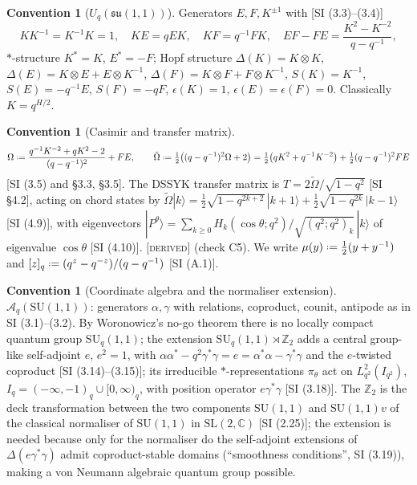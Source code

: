\documentclass[11pt,a4paper]{article}
\providecommand{\coloneqq}{\mathrel{\vcenter{\baselineskip0.5ex \lineskiplimit0pt
      \hbox{\scriptsize.}\hbox{\scriptsize.}}}=}
\newcommand{\DERIVED}{{\color{teal}\textsc{[derived]}}}
\theoremstyle{definition}
\newtheorem{convention}[definition]{Convention}
\theoremstyle{plain}
\newcommand{\Uq}{U_q(\mathfrak{su}(1,1))}
\newcommand{\SUq}{\mathrm{SU}_q(1,1)}
\newcommand{\Cas}{\Omega}                       %
\newcommand{\tCas}{\tilde\Omega}                %
\newcommand{\Z}{\mathbb{Z}}
\newcommand{\C}{\mathbb{C}}
\newcommand{\A}{\mathcal{A}}
\newcommand{\ket}[1]{|#1\rangle}
\renewcommand{\P}{P}                            %
\begin{document}
\begin{convention}[$\Uq$]\label{conv:Uq}
Generators $E,F,K^{\pm1}$ with [SI (3.3)--(3.4)]
\begin{equation}\label{eq:ourUq}
  KK^{-1}=K^{-1}K=1,\quad KE=qEK,\quad KF=q^{-1}FK,\quad
  EF-FE=\frac{K^{2}-K^{-2}}{q-q^{-1}},
\end{equation}
$*$-structure $K^{*}=K$, $E^{*}=-F$; Hopf structure $\Delta(K)=K\otimes K$,
$\Delta(E)=K\otimes E+E\otimes K^{-1}$, $\Delta(F)=K\otimes F+F\otimes K^{-1}$,
$S(K)=K^{-1}$, $S(E)=-q^{-1}E$, $S(F)=-qF$, $\epsilon(K)=1$, $\epsilon(E)=\epsilon(F)=0$.
Classically $K=q^{H/2}$.
\end{convention}

\begin{convention}[Casimir and transfer matrix]\label{conv:casimir}
\begin{equation}\label{eq:ourCasimir}
  \Cas \coloneqq \frac{q^{-1}K^{-2}+qK^{2}-2}{(q-q^{-1})^{2}}+FE,
  \qquad
  \tCas \coloneqq \tfrac12\big((q-q^{-1})^{2}\Cas+2\big)
  =\tfrac12\big(qK^{2}+q^{-1}K^{-2}\big)+\tfrac12 (q-q^{-1})^{2}FE
\end{equation}
[SI (3.5) and \S3.3, \S3.5]. The DSSYK transfer matrix is $T=2\tCas/\sqrt{1-q^{2}}$
[SI \S4.2], acting on chord states by
$\tCas\ket{k}=\tfrac12\sqrt{1-q^{2k+2}}\,\ket{k+1}+\tfrac12\sqrt{1-q^{2k}}\,\ket{k-1}$
[SI (4.9)], with eigenvectors
$\ket{\P^{\theta}}=\sum_{k\ge0}H_{k}(\cos\theta;q^{2})/\sqrt{(q^{2};q^{2})_{k}}\,\ket{k}$
of eigenvalue $\cos\theta$ [SI (4.10)]. \DERIVED{} (check C5). We write
$\mu(y)\coloneqq\tfrac12(y+y^{-1})$ and $[z]_{q}\coloneqq(q^{z}-q^{-z})/(q-q^{-1})$
[SI (A.1)].
\end{convention}

\begin{convention}[Coordinate algebra and the normaliser extension]\label{conv:normaliser}
$\A_q(\mathrm{SU}(1,1))$: generators $\alpha,\gamma$ with relations, coproduct, counit, antipode
as in SI (3.1)--(3.2). By Woronowicz's no-go theorem there is no locally compact quantum group
$\SUq$; the extension $\SUq\rtimes\Z_2$ adds a central group-like self-adjoint $e$, $e^{2}=1$,
with $\alpha\alpha^{*}-q^{2}\gamma^{*}\gamma=e=\alpha^{*}\alpha-\gamma^{*}\gamma$ and the
$e$-twisted coproduct [SI (3.14)--(3.15)]; its irreducible $*$-representations $\pi_{\theta}$ act
on $L^{2}_{q^{2}}(I_{q^{2}})$, $I_{q}=(-\infty,-1)_{q}\cup[0,\infty)_{q}$, with position operator
$e\gamma^{*}\gamma$ [SI (3.18)]. The $\Z_2$ is the deck transformation between the two components
$\mathrm{SU}(1,1)$ and $\mathrm{SU}(1,1)v$ of the classical normaliser of $\mathrm{SU}(1,1)$ in
$\mathrm{SL}(2,\C)$ [SI (2.25)]; the extension is needed because only for the normaliser do the
self-adjoint extensions of $\Delta(e\gamma^{*}\gamma)$ admit coproduct-stable domains
(``smoothness conditions'', SI (3.19)), making a von Neumann algebraic quantum group possible.
\end{convention}
\end{document}
